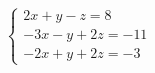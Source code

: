 \documentclass[preview]{standalone}
\begin{document}
\begin{align*}
\begin{cases}2x + y - z = 8 \\-3x - y + 2z = -11 \\-2x + y + 2z = -3\end{cases}
\end{align*}
\end{document}
